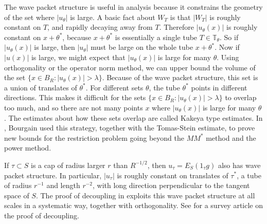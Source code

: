 \documentclass{amsart}
\newcommand{\TT}{\mathbb{T}}
\begin{document}
The wave packet structure is useful in analysis because it constrains the geometry of the set where $| u_\theta |$ is large.  A basic fact about $W_T$ is that $|W_T|$ is roughly constant on $T$, and rapidly decaying away from $T$.  Therefore $|u_\theta(x)|$ is roughly constant on $x + \theta^*$, because $x+ \theta^*$ is essentially a single tube $T \in \TT_\theta$.   So if $|u_\theta(x)|$ is large, then $|u_\theta|$ must be large on the whole tube $x + \theta^*$.  Now if $|u(x)|$ is large, we might expect that $|u_\theta(x)|$ is large for many $\theta$.  Using orthogonality or the operator norm method, we can upper bound the volume of the set $\{ x \in B_R: |u_\theta(x)| > \lambda \}$.  Because of the wave packet structure, this set is a union of translates of $\theta^*$.  For different sets $\theta$, the tube $\theta^*$ points in different directions.  This makes it difficult for the sets $\{ x \in B_R : |u_\theta(x)| > \lambda \}$ to overlap too much, and so there are not many points $x$ where $|u_\theta(x)|$ is large for many $\theta$.  The estimates about how these sets overlap are called Kakeya type estimates.  In \cite{B3}, Bourgain used this strategy, together with the Tomas-Stein estimate, to prove new bounds for the restriction problem going beyond the $M M^*$ method and the power method.  

If $\tau \subset S$ is a cap of radius larger $r$ than $R^{-1/2}$, then $u_\tau = E_S (1_\tau g)$ also has wave packet structure.  In particular, $|u_\tau|$ is roughly constant on translates of $\tau^*$, a tube of radius $r^{-1}$ and length $r^{-2}$, with long direction perpendicular to the tangent space of $S$.  The proof of decoupling in \cite{BD} exploits this wave packet structure at all scales in a systematic way, together with orthogonality.  See \cite{Gu} for a survey article on the proof of decoupling.  

\end{document}
